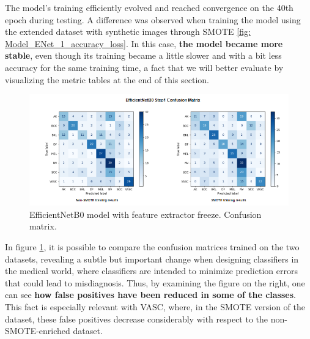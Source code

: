 The model's training efficiently evolved and reached convergence on the 40th epoch during testing. A difference was observed when training the model using the extended dataset with synthetic images through SMOTE \ref{fig: Model_ENet_1_accuracy_loss}. In this case, \textbf{the model became more stable}, even though its training became a little slower and with a bit less accuracy for the same training time, a fact that we will better evaluate by visualizing the metric tables at the end of this section.


\begin{figure}[ht]
    \begin{center}
        \includegraphics[scale=0.85]{images/Building/Model Efficientnet/model_ENetB0_1 Confmat.png}
        \caption{EfficientNetB0 model with feature extractor freeze. Confusion matrix.}
    \label{fig: Model_ENet_1_confmat}    
    \end{center}
\end{figure}

In figure \ref{fig: Model_ENet_1_confmat}, it is possible to compare the confusion matrices trained on the two datasets, revealing a subtle but important change when designing classifiers in the medical world, where classifiers are intended to minimize prediction errors that could lead to misdiagnosis. Thus, by examining the figure on the right, one can see \textbf{how false positives have been reduced in some of the classes}. This fact is especially relevant with VASC, where, in the SMOTE version of the dataset, these false positives decrease considerably with respect to the non-SMOTE-enriched dataset.


